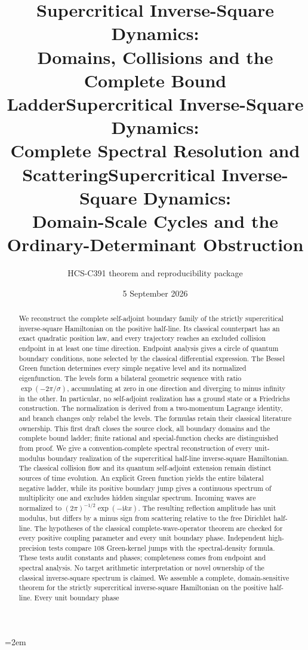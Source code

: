 \documentclass[10pt]{article}
\title{Supercritical Inverse-Square Dynamics:\\Domains, Collisions and the Complete Bound Ladder}
\title{Supercritical Inverse-Square Dynamics:\\Complete Spectral Resolution and Scattering}
\title{Supercritical Inverse-Square Dynamics:\\Domain-Scale Cycles and the Ordinary-Determinant Obstruction}
\author{HCS-C391 theorem and reproducibility package}
\date{5 September 2026}
\newcommand{\ii}{\mathrm i}
\begin{document}
\emergencystretch=2em
\maketitle
\begin{abstract}
\ifcase\CRevisionRound
We reconstruct the complete self-adjoint boundary family of the strictly
supercritical inverse-square Hamiltonian on the positive half-line.
Its classical counterpart has an exact quadratic position law, and every
trajectory reaches an excluded collision endpoint in at least one time direction.
Endpoint analysis gives a circle of quantum boundary conditions, none selected
by the classical differential expression. The Bessel Green function determines
every simple negative level and its normalized eigenfunction.
The levels form a bilateral geometric sequence with ratio
$\exp(-2\pi/\sigma)$, accumulating at zero in one direction and diverging to
minus infinity in the other. In particular, no self-adjoint realization has a
ground state or a Friedrichs construction. The normalization is derived from
a two-momentum Lagrange identity, and branch changes only relabel the levels.
The formulas retain their classical literature ownership. This first draft
closes the source clock, all boundary domains and the complete bound ladder;
finite rational and special-function checks are distinguished from proof.
\or
We give a convention-complete spectral reconstruction of every unit-modulus
boundary realization of the supercritical half-line inverse-square Hamiltonian.
The classical collision flow and its quantum self-adjoint extension remain
distinct sources of time evolution. An explicit Green function yields the
entire bilateral negative ladder, while its positive boundary jump gives a
continuous spectrum of multiplicity one and excludes hidden singular spectrum.
Incoming waves are normalized to $(2\pi)^{-1/2}\exp(-\ii kx)$.
The resulting reflection amplitude has unit modulus, but differs by a minus
sign from scattering relative to the free Dirichlet half-line.
The hypotheses of the classical complete-wave-operator theorem are checked
for every positive coupling parameter and every unit boundary phase.
Independent high-precision tests compare 108 Green-kernel jumps with the
spectral-density formula. These tests audit constants and phases; completeness
comes from endpoint and spectral analysis. No target arithmetic interpretation
or novel ownership of the classical inverse-square spectrum is claimed.
\else
We assemble a complete, domain-sensitive theorem for the strictly supercritical
inverse-square Hamiltonian on the positive half-line. Every unit boundary phase

\end{abstract}
\end{document}
